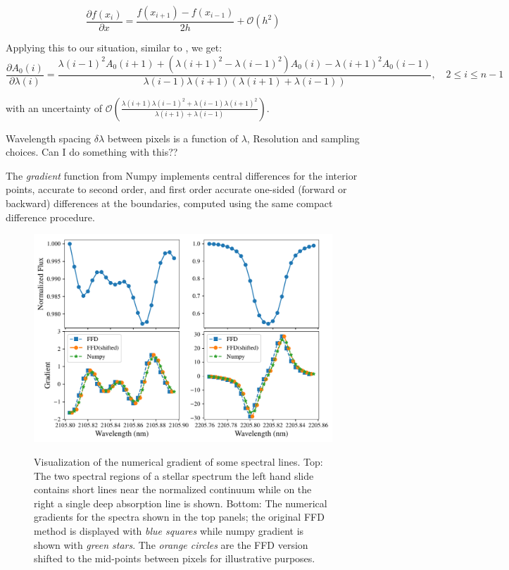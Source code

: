 \[\frac{\partial{f(x_i)}}{\partial{x}} = \frac{f\left(x_{i+1}\right) - f\left(x_{i-1}\right)}{2h} + \mathcal{O}\left(h^{2}\right)\]


Applying this to our situation, similar to , we get:
\[\frac{\partial A_0(i)}{\partial\lambda(i)} = \frac{{\lambda(i-1)}^{2} A_0(i+1) + ({\lambda(i+1)}^{2}-{\lambda(i-1)}^{2}) A_0(i) - {\lambda(i+1)}^{2} A_0(i-1)} {\lambda(i-1)\lambda(i+1)(\lambda(i+1) + \lambda(i-1))}, \hspace{1em} 2 \leq i \leq n-1\]

with an uncertainty of \(\mathcal{O}\left(\frac{\lambda(i+1){\lambda(i-1)}^{2} + \lambda(i-1){\lambda(i+1)}^{2}}{\lambda(i+1) + \lambda(i-1)}\right)\).


{\red{} Wavelength spacing \(\delta\lambda\) between pixels is a function of \(\lambda\), Resolution and sampling choices. Can I do something with this??}

The \emph{gradient} function from Numpy implements central differences for the interior points, accurate to second order, and first order accurate one-sided (forward or backward) differences at the boundaries, computed using the same compact difference procedure.

\begin{figure}
    \centering
    \includegraphics[width=0.8\linewidth]{figures/information-content/spectral_gradients}\\
    \caption{Visualization of the numerical gradient of some spectral lines. Top: The two spectral regions of a stellar spectrum the left hand slide contains short lines near the normalized continuum while on the right a single deep absorption line is shown. Bottom: The numerical gradients for the spectra shown in the top panels; the original FFD method is displayed  with \emph{blue squares} while numpy gradient is shown with \emph{green stars}. The \emph{orange circles} are the FFD version shifted to the mid-points between pixels for illustrative purposes.}
    \label{fig:gradients}
\end{figure}


